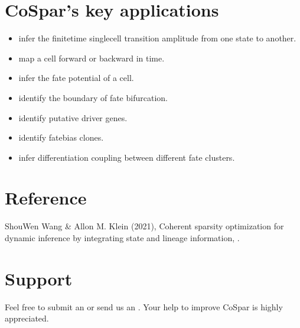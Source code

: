 \documentclass[letterpaper,10pt,english]{sphinxmanual}
\begin{document}
\chapter{CoSpar’s key applications}
\label{\detokenize{index:cospar-s-key-applications}}\begin{itemize}
\item {} 
infer the finite\sphinxhyphen{}time single\sphinxhyphen{}cell transition amplitude from one state to another.

\item {} 
map a cell forward or backward in time.

\item {} 
infer the fate potential of a cell.

\item {} 
identify the boundary of fate bifurcation.

\item {} 
identify putative driver genes.

\item {} 
identify fate\sphinxhyphen{}bias clones.

\item {} 
infer differentiation coupling between different fate clusters.

\end{itemize}


\chapter{Reference}
\label{\detokenize{index:reference}}
Shou\sphinxhyphen{}Wen Wang \& Allon M. Klein (2021), Coherent sparsity optimization for dynamic inference by integrating state and lineage information,
.



\chapter{Support}
\label{\detokenize{index:support}}
Feel free to submit an 
or send us an .
Your help to improve CoSpar is highly appreciated.
\end{document}
